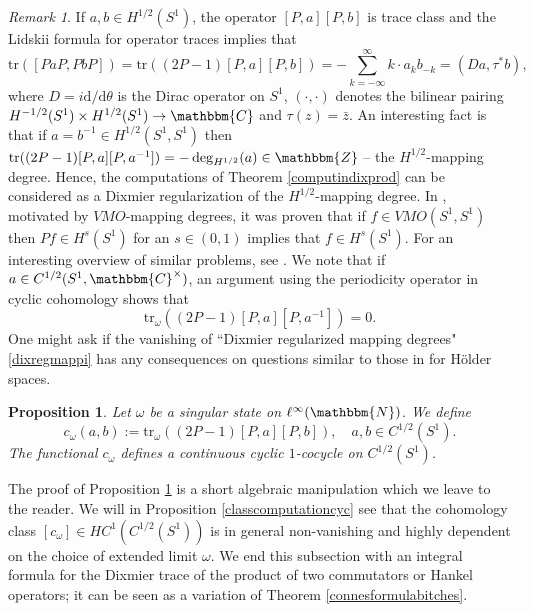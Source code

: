 \documentclass[10pt]{amsart}
\newtheorem{prop}[thm]{Proposition}
\theoremstyle{remark}
\newtheorem{remark}[thm]{Remark}
\theoremstyle{definition}
\begin{document}
\begin{remark}
\label{commentsonwinding}
If $a,b\in H^{1/2}(S^1)$, the operator $[P,a][P,b]$ is trace class and the Lidskii formula for operator traces implies that 
$${\mathrm{t}\mathrm{r}}([PaP,PbP])={\mathrm{t}\mathrm{r}}((2P-1)[P,a][P,b])=-\sum_{k=-\infty}^\infty k\cdot a_k b_{-k}=(Da,\tau^*b),$$
where $D=i{\mathrm{d}}/{\mathrm{d}}\theta$ is the Dirac operator on $S^1$, $(\cdot,\cdot)$ denotes the bilinear pairing $H^{-1/2}(S^1)\times H^{1/2}(S^1)\to {\mathbbm{C}}$ and $\tau(z)=\bar{z}$. An interesting fact is that if $a=b^{-1}\in H^{1/2}(S^1,S^1)$ then ${\mathrm{t}\mathrm{r}}((2P-1)[P,a][P,a^{-1}])=-\deg_{H^{1/2}}(a)\in {\mathbbm{Z}}$ -- the $H^{1/2}$-mapping degree. Hence, the computations of Theorem \ref{computindixprod} can be considered as a Dixmier regularization of the $H^{1/2}$-mapping degree. In \cite{bourgeonkahane}, motivated by $VMO$-mapping degrees, it was proven that if $f\in VMO(S^1,S^1)$ then $Pf\in H^s(S^1)$ for an $s\in (0,1)$ implies that $f\in H^s(S^1)$. For an interesting overview of similar problems, see \cite{kahanewindandfour}. We note that if $a\in C^{1/2}(S^1,{\mathbbm{C}}^\times)$, an argument using the periodicity operator in cyclic cohomology shows that 
\begin{equation}
\label{dixregmappi}
{\mathrm{t}\mathrm{r}}_\omega((2P-1)[P,a][P,a^{-1}])=0.
\end{equation}
One might ask if the vanishing of ``Dixmier regularized mapping degrees" \eqref{dixregmappi} has any consequences on questions similar to those in \cite{kahanewindandfour} for H\"older spaces. 
\end{remark}

\begin{prop}
\label{cyclicprop}
Let $\omega$ be a singular state on $\ell^\infty({\mathbbm{N}})$. We define
$$c_\omega(a,b):={\mathrm{t}\mathrm{r}}_\omega((2P-1)[P,a][P,b]), \quad a,b\in C^{1/2}(S^1).$$
The functional $c_\omega$ defines a continuous cyclic $1$-cocycle on $C^{1/2}(S^1)$.
\end{prop}

The proof of Proposition \ref{cyclicprop} is a short algebraic manipulation which we leave to the reader. We will in Proposition \ref{classcomputationcyc} see that the cohomology class $[c_\omega]\in HC^1(C^{1/2}(S^1))$ is in general non-vanishing and highly dependent on the choice of extended limit $\omega$. We end this subsection with an integral formula for the Dixmier trace of the product of two commutators or Hankel operators; it can be seen as a variation of Theorem \ref{connesformulabitches}.
\end{document}
